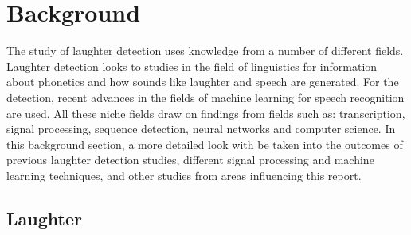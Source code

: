 \documentclass[a4paper,11pt,notitlepage]{article}
\begin{document}
\newpage

\section{Background}


The study of laughter detection uses knowledge from a number of different fields. Laughter detection looks to studies in the field of linguistics for information about phonetics and how sounds like laughter and speech are generated. For the detection, recent advances in the fields of machine learning for speech recognition are used. All these niche fields draw on findings from fields such as: transcription, signal processing, sequence detection, neural networks and computer science. In this background section, a more detailed look with be taken into the outcomes of previous laughter detection studies, different signal processing and machine learning techniques, and other studies from areas influencing this report. 

\subsection{Laughter}\label{subsection:laughter}

\end{document}
